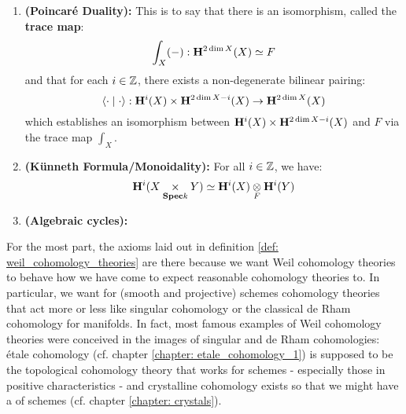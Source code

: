 \begin{definition}
\begin{enumerate}
                            \item \textbf{(Poincar\'e Duality):} This is to say that there is an isomorphism, called the \textbf{trace map}:
                                $$\int_X(-): \mathbf{H}^{2 \dim X}(X) \simeq F$$
                            and that for each $i \in \mathbb{Z}$, there exists a non-degenerate bilinear pairing:
                                $$\<\cdot \mid \cdot\>: \H^i(X) \x \H^{2\dim X - i}(X) \to \H^{2 \dim X}(X)$$
                            which establishes an isomorphism between $\H^i(X) \x \H^{2\dim X - i}(X)$ and $F$ via the trace map $\int_X$. 
                            \item \textbf{(K\"unneth Formula/Monoidality):} For all $i \in \mathbb{Z}$, we have:
                                $$\H^i(X \x_{\Spec k} Y) \cong \H^i(X) \tensor_F \H^i(Y)$$
                            \item \textbf{(Algebraic cycles):}
                        \end{enumerate}
                \end{definition}
                \begin{remark} \label{remark: motivation_for_motives}
                    For the most part, the axioms laid out in definition \ref{def: weil_cohomology_theories} are there because we want Weil cohomology theories to behave how we have come to expect reasonable  cohomology theories to. In particular, we want for (smooth and projective) schemes cohomology theories that act more or less like singular cohomology or the classical de Rham cohomology for manifolds. In fact, most famous examples of Weil cohomology theories were conceived in the images of singular and de Rham cohomologies: \'etale cohomology (cf. chapter \ref{chapter: etale_cohomology_1}) is supposed to be the topological cohomology theory that works for schemes - especially those in positive characteristics - and crystalline cohomology exists so that we might have a  of schemes (cf. chapter \ref{chapter: crystals}). 
                \end{remark}
                \begin{remark} \label{remark: lefschetz_axioms}
                    
                \end{remark}
